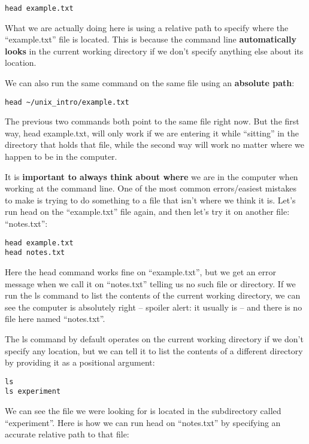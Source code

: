 \documentclass[
]{book}
\begin{document}
\begin{verbatim}
head example.txt
\end{verbatim}

What we are actually doing here is using a relative path to specify where the ``example.txt'' file is located. This is because the command line \textbf{automatically looks} in the current working directory if we don't specify anything else about its location.

We can also run the same command on the same file using an \textbf{absolute path}:

\begin{verbatim}
head ~/unix_intro/example.txt
\end{verbatim}

The previous two commands both point to the same file right now. But the first way, head example.txt, will only work if we are entering it while ``sitting'' in the directory that holds that file, while the second way will work no matter where we happen to be in the computer.

It is \textbf{important to always think about where} we are in the computer when working at the command line. One of the most common errors/easiest mistakes to make is trying to do something to a file that isn't where we think it is. Let's run head on the ``example.txt'' file again, and then let's try it on another file: ``notes.txt'':

\begin{verbatim}
head example.txt
head notes.txt
\end{verbatim}

Here the head command works fine on ``example.txt'', but we get an error message when we call it on ``notes.txt'' telling us no such file or directory. If we run the ls command to list the contents of the current working directory, we can see the computer is absolutely right -- spoiler alert: it usually is -- and there is no file here named ``notes.txt''.

The ls command by default operates on the current working directory if we don't specify any location, but we can tell it to list the contents of a different directory by providing it as a positional argument:

\begin{verbatim}
ls
ls experiment
\end{verbatim}

We can see the file we were looking for is located in the subdirectory called ``experiment''. Here is how we can run head on ``notes.txt'' by specifying an accurate relative path to that file:
\end{document}
